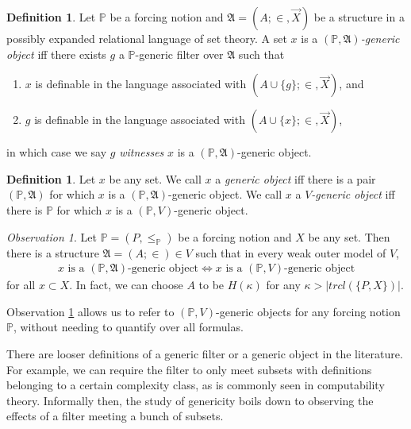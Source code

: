 \documentclass[12pt, twoside]{memoir}
\numberwithin{equation}{section}
\theoremstyle{definition}
\newtheorem{defi}[thm]{Definition}
\theoremstyle{remark}
\newtheorem{ob}[thm]{Observation}
\theoremstyle{definition}
\theoremstyle{definition}
\theoremstyle{definition}
\theoremstyle{remark}
\begin{document}
\begin{defi}
Let $\mathbb{P}$ be a forcing notion and $\mathfrak{A} = (A; \in, \Vec{X})$ be a structure in a possibly expanded relational language of set theory. A set $x$ is a $(\mathbb{P}, \mathfrak{A})$\emph{-generic object} iff there exists $g$ a $\mathbb{P}$-generic filter over $\mathfrak{A}$ such that
\begin{enumerate}[label=(\alph*)]
    \item $x$ is definable in the language associated with $(A \cup \{g\}; \in, \Vec{X})$, and
    \item $g$ is definable in the language associated with $(A \cup \{x\}; \in, \Vec{X})$,
\end{enumerate}
in which case we say $g$ \emph{witnesses} $x$ is a $(\mathbb{P}, \mathfrak{A})$-generic object.
\end{defi}

\begin{defi}
Let $x$ be any set. We call $x$ a \emph{generic object} iff there is a pair $(\mathbb{P}, \mathfrak{A})$ for which $x$ is a $(\mathbb{P}, \mathfrak{A})$-generic object. We call $x$ a $V$\emph{-generic object} iff there is $\mathbb{P}$ for which $x$ is a $(\mathbb{P}, V)$-generic object.
\end{defi}

\begin{ob}\label{ob0}
Let $\mathbb{P} = (P, \leq_{\mathbb{P}})$ be a forcing notion and $X$ be any set. Then there is a structure $\mathfrak{A} = (A; \in) \in V$ such that in every weak outer model of $V$, 
\begin{align*}
    x \text{ is a } (\mathbb{P}, \mathfrak{A}) \text{-generic object} \iff x \text{ is a } (\mathbb{P}, V) \text{-generic object}
\end{align*}
for all $x \subset X$. In fact, we can choose $A$ to be $H(\kappa)$ for any $\kappa > |trcl(\{P, X\})|$.
\end{ob}

Observation \ref{ob0} allows us to refer to $(\mathbb{P}, V)$-generic objects for any forcing notion $\mathbb{P}$, without needing to quantify over all formulas.

There are looser definitions of a generic filter or a generic object in the literature. For example, we can require the filter to only meet subsets with definitions belonging to a certain complexity class, as is commonly seen in computability theory. Informally then, the study of genericity boils down to observing the effects of a filter meeting a bunch of subsets. 
\end{document}
